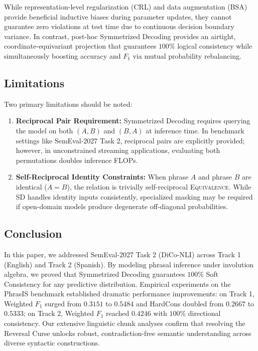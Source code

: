 \documentclass[11pt,a4paper,twocolumn]{article}
\begin{document}
While representation-level regularization (CRL) and data augmentation (BSA) provide beneficial inductive biases during parameter updates, they cannot guarantee zero violations at test time due to continuous decision boundary variance. In contrast, post-hoc Symmetrized Decoding provides an airtight, coordinate-equivariant projection that guarantees $100\%$ logical consistency while simultaneously boosting accuracy and $F_1$ via mutual probability rebalancing.

\subsection{Limitations}
Two primary limitations should be noted:
\begin{enumerate}
    \item \textbf{Reciprocal Pair Requirement:} Symmetrized Decoding requires querying the model on both $(A, B)$ and $(B, A)$ at inference time. In benchmark settings like SemEval-2027 Task 2, reciprocal pairs are explicitly provided; however, in unconstrained streaming applications, evaluating both permutations doubles inference FLOPs.
    \item \textbf{Self-Reciprocal Identity Constraints:} When phrase $A$ and phrase $B$ are identical ($A = B$), the relation is trivially self-reciprocal \textsc{Equivalence}. While SD handles identity inputs consistently, specialized masking may be required if open-domain models produce degenerate off-diagonal probabilities.
\end{enumerate}

\subsection{Conclusion}
In this paper, we addressed SemEval-2027 Task 2 (DiCo-NLI) across Track 1 (English) and Track 2 (Spanish). By modeling phrasal inference under involution algebra, we proved that Symmetrized Decoding guarantees $100\%$ Soft Consistency for any predictive distribution. Empirical experiments on the PhrasIS benchmark established dramatic performance improvements: on Track 1, Weighted $F_1$ surged from $0.3151$ to $0.5484$ and HardCons doubled from $0.2667$ to $0.5333$; on Track 2, Weighted $F_1$ reached $0.4246$ with $100\%$ directional consistency. Our extensive linguistic chunk analyses confirm that resolving the Reversal Curse unlocks robust, contradiction-free semantic understanding across diverse syntactic constructions.



\end{document}
